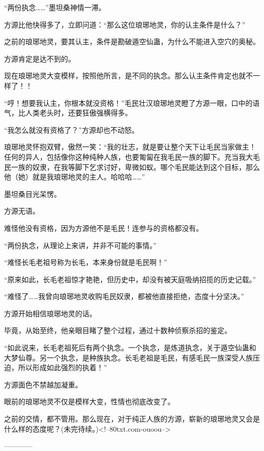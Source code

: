 \begin{this_body}
“两份执念……”墨坦桑神情一滞。

方源比他快得多了，立即问道：“那么这位琅琊地灵，你的认主条件是什么？”

之前的琅琊地灵，要其认主，条件是勘破遁空仙蛊，为什么不能进入空穴的奥秘。

方源肯定是达不到的。

现在琅琊地灵大变模样，按照他所言，是不同的执念。那么认主条件肯定也就不一样了！！

“哼！想要我认主，你根本就没资格！”毛民壮汉琅琊地灵瞪了方源一眼，口中的语气，比人类老头时，还要狂傲强横得多。

“我怎么就没有资格了？”方源却也不动怒。

琅琊地灵怀抱双臂，傲然一笑：“我的壮志，就是要让整个天下让毛民当家做主！任何的异人，包括像你这种纯种人族，也要匍匐在我毛民一族的脚下。充当我大毛民一族的奴隶，在我等脚下乞求讨好，卑微如蚁。哪个毛民能达到这个目标，那么他（她）就是我琅琊地灵的主人。哈哈哈……”

墨坦桑目光呆愣。

方源无语。

难怪他没有资格，因为方源他不是毛民！连参与的资格都没有。

“两份执念，从理论上来讲，并非不可能的事情。”

“难怪长毛老祖号称为长毛，本来身份就是毛民啊！”

“原来如此，长毛老祖惊才艳艳，但历史中，却没有被天庭吸纳招揽的历史记载。”

“难怪了……我曾向琅琊地灵收购毛民奴隶，都被他直接拒绝，态度十分坚决。”

方源开始相信琅琊地灵的话。

毕竟，从始至终，他亲眼目睹了整个过程，通过十数种侦察杀招的鉴定。

“如此说来，长毛老祖死后有两个执念。一个执念，是炼道执念，关于遁空仙蛊和大梦仙尊。另一个执念，是种族执念。长毛老祖是毛民，有感毛民一族深受人族压迫，所以形成如此强烈的执着！”

方源面色不禁越加凝重。

眼前的琅琊地灵不仅是模样大变，性情也彻底改变了。

之前的交情，都不管用。那么现在，对于纯正人族的方源，崭新的琅琊地灵又会是什么样的态度呢？(未完待续。)<!--80txt.com-ouoou-->

------------

\end{this_body}

